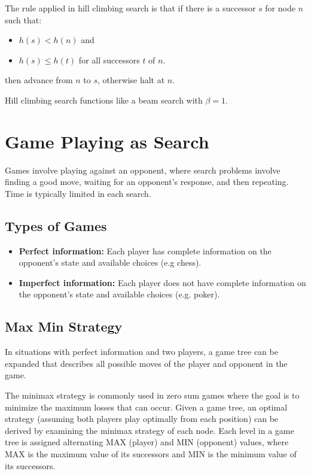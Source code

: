 \documentclass[12pt,titlepage]{article}
\begin{document}
      The rule applied in hill climbing search is that if there is a successor $s$ for node $n$ such that:
      \begin{itemize}
        \item $h(s) < h(n)$ and
        \item $h(s) \leq h(t)$ for all successors $t$ of $n$.
      \end{itemize}
      then advance from $n$ to $s$, otherwise halt at $n$.

      Hill climbing search functions like a beam search with $\beta = 1$.

  \newpage

  \section{Game Playing as Search}
    Games involve playing against an opponent, where search problems involve finding a good move, waiting for an opponent's response, and then
    repeating. Time is typically limited in each search.

    \subsection{Types of Games}
      \begin{itemize}
        \item \textbf{Perfect information:} Each player has complete information on the opponent's state and available choices (e.g chess).
        \item \textbf{Imperfect information:} Each player does not have complete information on the opponent's state and available choices (e.g. poker).
      \end{itemize}

    \subsection{Max Min Strategy}
      In situations with perfect information and two players, a game tree can be expanded that describes all possible moves of the player and opponent
      in the game.

      The minimax strategy is commonly used in zero sum games where the goal is to minimize the maximum losses that can occur. Given a game tree, an
      optimal strategy (assuming both players play optimally from each position) can be derived by examining the minimax strategy of each node. Each
      level in a game tree is assigned alternating MAX (player) and MIN (opponent) values, where MAX is the maximum value of its successors and MIN is the
      minimum value of its successors.
\end{document}
